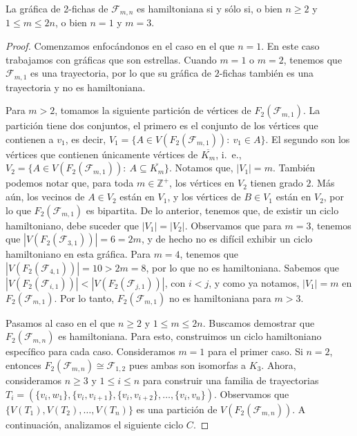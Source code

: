 \begin{teorema}
\label{teo:2-TokGenerFan}
    La gr\'afica de 2-fichas de $\mathcal{F}_{m,n}$ es hamiltoniana si y s\'olo
    si, o bien $n \geq 2$ y $1 \leq m \leq 2n$, o  bien $n=1$ y $m=3$.
\end{teorema}

\begin{proof}
    Comenzamos enfoc\'andonos en el caso en el que $n=1$. En este caso
    trabajamos con gr\'aficas que son estrellas. Cuando $m=1$ o $m=2$, tenemos
    que $\mathcal{F}_{m,1}$ es una trayectoria, por lo que su gr\'afica de
    $2$-fichas tambi\'en es una trayectoria y no es hamiltoniana. 
    
    Para $m > 2$, tomamos la siguiente partici\'on de v\'ertices de
    $F_2(\mathcal{F}_{m,1})$. La partici\'on tiene dos conjuntos, el primero es
    el conjunto de los v\'ertices que contienen a $v_1$, es decir, $V_1=\{A \in
    V(F_2(\mathcal{F}_{m,1})) \colon\ v_1 \in A\}$. El segundo son los
    v\'ertices que contienen \'unicamente v\'ertices de $\overline{K_m}$, i.~e.,
    $V_2=\{A \in V(F_2(\mathcal{F}_{m,1})) \colon\ A \subseteq \overline{K_m}
    \}$. Notamos que, $|V_1|=m$. Tambi\'en podemos notar que, para toda $m \in
    \mathbb{Z^+}$, los v\'ertices en $V_2$ tienen grado $2$. M\'as a\'un, los
    vecinos de $A \in V_2$ est\'an en $V_1$, y los v\'ertices de $B \in V_1$
    est\'an en $V_2$, por lo que $F_2(\mathcal{F}_{m,1})$ es bipartita. De lo
    anterior, tenemos que, de existir un ciclo hamiltoniano, debe suceder que
    $|V_1| = |V_2|$. Observamos que para $m=3$, tenemos que
    $|V(F_2(\mathcal{F}_{3,1}))| = 6 = 2m$, y de hecho no es dif\'icil exhibir
    un ciclo hamiltoniano en esta gr\'afica. Para $m=4$, tenemos que
    $|V(F_2(\mathcal{F}_{4,1}))| = 10 > 2m=8$, por lo que no es hamiltoniana.
    Sabemos que $|V(F_2(\mathcal{F}_{i,1}))| < |V(F_2(\mathcal{F}_{j,1}))|$, con
    $i<j$, y como ya notamos, $|V_1| = m$ en $F_2(\mathcal{F}_{m,1})$.   Por lo
    tanto, $F_2(\mathcal{F}_{m,1})$ no es hamiltoniana para $m >3$.

    Pasamos al caso en el que $n \geq 2$ y $1 \leq m \leq 2n$. Buscamos
    demostrar que $F_2(\mathcal{F}_{m,n})$ es hamiltoniana. Para esto,
    construimos un ciclo hamiltoniano espec\'ifico para cada caso. Consideramos
    $m=1$ para el primer caso. Si $n=2$, entonces $F_2(\mathcal{F}_{m,n}) \cong
    \mathcal{F}_{1,2}$ pues ambas son isomorfas a $K_3$. Ahora, consideramos $n
    \geq 3$ y $1 \leq i \leq n$ para construir una familia de
    trayectorias $T_i=(\{v_i,w_1\},\{v_i,v_{i+1}\},\{v_i,v_{i+2}\},\dots,
    \{v_i,v_n\})$. Observamos que $\{V(T_1),V(T_2),\dots, V(T_n)\}$ es una
    partici\'on de $V(F_2(\mathcal{F}_{m,n}))$. A continuaci\'on, analizamos el
    siguiente ciclo $C$.
    

\end{proof}

